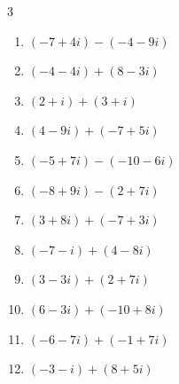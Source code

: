 \begin{multicols}{3}
\begin{enumerate}
        \phantom{$\displaystyle =-18-3i$}

  \item $\displaystyle (-7+4i) - (-4-9i)$

        \phantom{$\displaystyle =-3+13i$}

  \item $\displaystyle (-4-4i) + (8-3i)$

        \phantom{$\displaystyle =4-7i$}

  \item $\displaystyle (2+i) + (3+i)$

        \phantom{$\displaystyle =5+2i$}

  \item $\displaystyle (4-9i) + (-7+5i)$

        \phantom{$\displaystyle =-3-4i$}

  \item $\displaystyle (-5+7i) - (-10-6i)$

        \phantom{$\displaystyle =5+13i$}

  \item $\displaystyle (-8+9i) - (2+7i)$

        \phantom{$\displaystyle =-10+2i$}

  \item $\displaystyle (3+8i) + (-7+3i)$

        \phantom{$\displaystyle =-4+11i$}

  \item $\displaystyle (-7-i) + (4-8i)$

        \phantom{$\displaystyle =-3-9i$}

  \item $\displaystyle (3-3i) + (2+7i)$

        \phantom{$\displaystyle =5+4i$}

  \item $\displaystyle (6-3i) + (-10+8i)$

        \phantom{$\displaystyle =-4+5i$}

\columnbreak %

\resetques

  \item $\displaystyle (-6-7i) + (-1+7i)$

        \phantom{$\displaystyle =-7$}

  \item $\displaystyle (-3-i) + (8+5i)$

        \phantom{$\displaystyle =5+4i$}


\end{enumerate}
\end{multicols}
